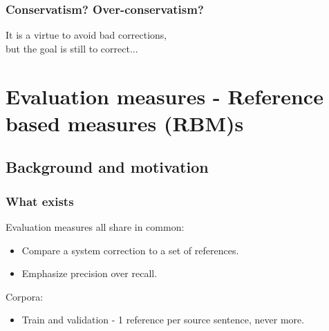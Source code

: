 \documentclass{beamer}
\begin{document}
{\begin{frame}
\begin{figure}
	\end{figure}
\end{frame}
\begin{frame}
	\frametitle{Conservatism? Over-conservatism?}
	It is a virtue to avoid bad corrections, \\but the goal is still to correct...
\end{frame}
}
\section{Evaluation measures - Reference based measures (RBM)s}
\subsection{Background and motivation}
\begin{frame}[label=RBM]
	\frametitle{What exists}
	Evaluation measures all share in common:
	\begin{itemize}
	\item Compare a system correction to a set of references.
	\item Emphasize precision over recall.
	\end{itemize}
	
	Corpora:
	\begin{itemize}
	\item Train and validation - 1 reference per source sentence, never more.
	\end{itemize}
\end{frame}
\end{document}
